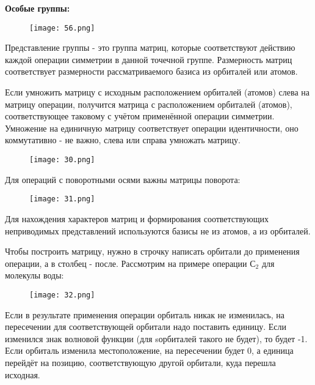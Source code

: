 \begin{center}
	\textbf{Особые группы:}
\end{center}


\begin{figure}[H]
	\centering
	{\texttt{[image: 56.png]}}
\end{figure}

	Представление группы - это группа матриц, которые соответствуют
	действию каждой операции симметрии в данной точечной группе.
	Размерность матриц соответствует размерности рассматриваемого
	базиса из орбиталей или атомов.
	
	\par\smallskip
	
	
	Если умножить матрицу с исходным расположением орбиталей
	(атомов) слева на матрицу операции, получится матрица с
	расположением орбиталей (атомов), соответствующее таковому с
	учётом применённой операции симметрии. Умножение на
	единичную матрицу соответствует операции идентичности, оно
	коммутативно - не важно, слева или справа умножать матрицу.
	
	\begin{figure}[H]
		\centering
		{\texttt{[image: 30.png]}}
	\end{figure}
	
	Для операций с поворотными осями важны матрицы поворота:
	
	\begin{figure}[H]
		\centering
		{\texttt{[image: 31.png]}}
	\end{figure}
	
	
	Для нахождения характеров матриц и формирования
	соответствующих неприводимых представлений используются
	базисы не из атомов, а из орбиталей.
	
	\par\smallskip
	
	Чтобы построить матрицу, нужно в строчку написать орбитали до
	применения операции, а в столбец - после. Рассмотрим на примере
	операции $С_2$ для молекулы воды:
	
		\begin{figure}[H]
		\centering
		{\texttt{[image: 32.png]}}
	\end{figure}
	

	Если в результате применения операции орбиталь никак не
	изменилась, на пересечении для соответствующей орбитали надо
	поставить единицу. Если изменился знак волновой функции (для sорбиталей такого не будет), то будет -1. Если орбиталь изменила
	местоположение, на пересечении будет 0, а единица перейдёт на
	позицию, соответствующую другой орбитали, куда перешла
	исходная.
	
